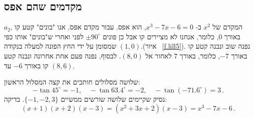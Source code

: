 \subsection{מקדמים שהם אפס}\label{s.zero}

$a_2$,
המקדם של
$x^2$
ב-%
$x^3-7x-6=0$,
הוא אפס. עבור מקדם אפס, אנו "בונים" קטע קו באורך
$0$,
כלומר, אנחנו לא מציירים קו אבל כן פונים
$\pm 90^\circ$
לפני ואחרי ש"בונים" אותו כפי שמסומן על ידי החץ הפונה למעלה בנקודה $(1,0)$.(איור%
~\ref{f.lill5}).
נפנה שוב ונבנה קטע קו באורך
$-7$,
כלומר, באורך
$7$
לאחור אל
$(8,0)$. 
לבסוף, נפנה פעם אחת אחרונה ונבנה קטע קו באורך
$-6$
עד
$(8,6)$.

שלושה מסלולים חותכים את קצה המסלול הראשון:
\[
-\tan 45^\circ=-1,\quad -\tan 63.4^\circ =-2,\quad -\tan (-71.6^\circ)=3\,.
\]
נסיק שקיימים שלושה שורשים ממשיים $\{-1,-2,3\}$. בדיקה:
\[
(x+1)(x+2)(x-3)=(x^2+3x+2)(x-3) =x^3-7x-6\,.
\]
